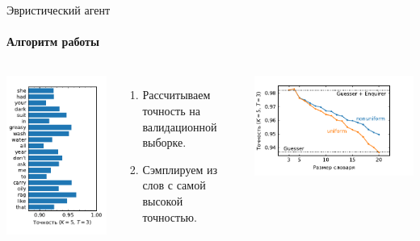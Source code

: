 \documentclass[aspectratio=43]{beamer}
\newcommand{\imgscale}{0.67}
\begin{document}
\begin{frame}{Эвристический агент}
    \framesubtitle{Алгоритм работы}
    \begin{columns}[b]
        \includegraphics[height=.8\textheight]{../plots/word_scores.pdf}
        \begin{enumerate}
            \item Рассчитываем точность на валидационной выборке.
            \item Сэмплируем из слов с самой высокой точностью.
        \end{enumerate}
        \begin{center}
            \includegraphics[scale=\imgscale]{../plots/heuristic.pdf}
        \end{center}
    \end{columns}
\end{frame}
\end{document}
